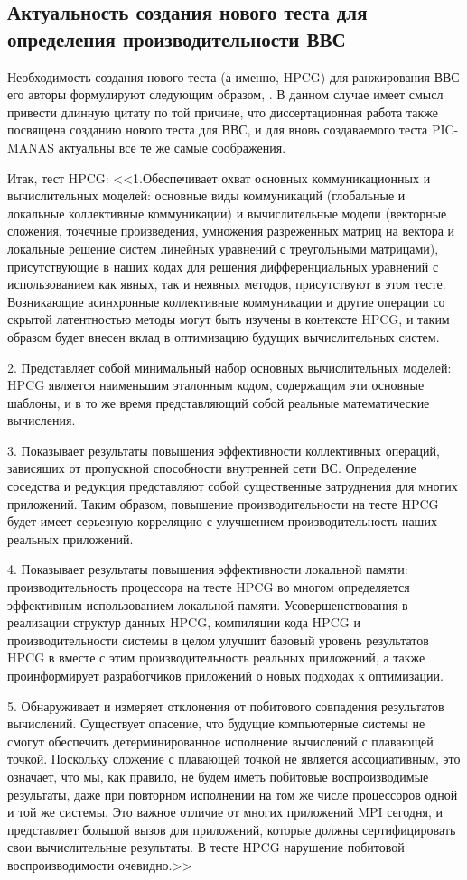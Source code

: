 \subsection{Актуальность создания нового теста для определения производительности ВВС}
Необходимость создания нового теста (а именно, HPCG) для ранжирования ВВС его авторы формулируют следующим образом, \cite{HerouxHPCG}. В данном случае имеет смысл привести длинную цитату по той причине, что диссертационная работа также посвящена созданию нового теста для ВВС, и для вновь создаваемого теста PIC-MANAS актуальны все те же самые соображения.

Итак, тест HPCG:
<<1.Обеспечивает охват основных коммуникационных и вычислительных моделей:
основные виды коммуникаций (глобальные и локальные коллективные коммуникации) и вычислительные модели
(векторные сложения, точечные произведения, умножения разреженных матриц на вектора и локальные решение систем линейных уравнений с треугольными матрицами), присутствующие в наших кодах для решения дифференциальных уравнений с использованием как явных, так и неявных методов,
присутствуют в этом тесте. Возникающие асинхронные коллективные коммуникации и другие операции со скрытой латентностью методы могут быть изучены в контексте HPCG, и таким образом будет внесен вклад в оптимизацию будущих вычислительных систем.

2. Представляет собой минимальный набор основных вычислительных моделей: HPCG является наименьшим
эталонным кодом, содержащим эти основные шаблоны, и в то же время представляющий собой
реальные математические вычисления.

3. Показывает результаты повышения эффективности коллективных операций, зависящих от пропускной способности внутренней сети ВС. Определение соседства и редукция представляют собой существенные затруднения для многих приложений. Таким образом, повышение производительности на тесте HPCG будет
имеет серьезную корреляцию с улучшением производительность наших реальных приложений.

4. Показывает результаты повышения эффективности локальной памяти: производительность процессора
на тесте HPCG во многом определяется эффективным использованием локальной памяти.
Усовершенствования в реализации структур данных HPCG, компиляции кода HPCG
и производительности системы в целом улучшит базовый уровень результатов HPCG
в вместе с этим производительность реальных приложений, а также проинформирует разработчиков приложений о новых подходах к оптимизации.

5. Обнаруживает и измеряет отклонения от побитового совпадения результатов вычислений.
Существует опасение, что будущие компьютерные системы не смогут обеспечить детерминированное исполнение
 вычислений с плавающей точкой. Поскольку сложение с плавающей точкой не является ассоциативным,
это означает, что мы, как правило, не будем иметь побитовые воспроизводимые результаты, даже при повторном исполнении на том же числе процессоров одной и той же системы.
Это важное отличие от многих приложений MPI сегодня, и представляет большой
вызов для приложений, которые должны сертифицировать свои вычислительные результаты. В тесте  HPCG нарушение побитовой воспроизводимости очевидно.>>

